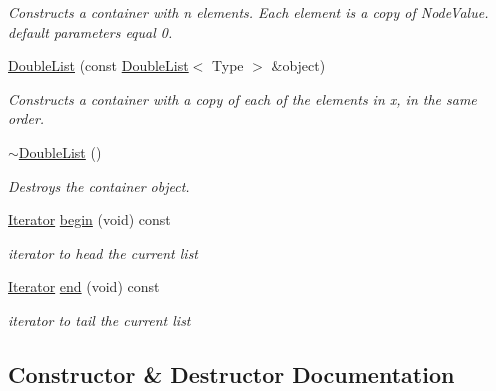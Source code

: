 \begin{DoxyCompactItemize}
\begin{DoxyCompactList}\small\item\em Constructs a container with n elements. Each element is a copy of Node\+Value. default parameters equal 0. \end{DoxyCompactList}\item 
\hyperlink{classDoubleList_aba69ed048141748e3269969748b12c0a}{Double\+List} (const \hyperlink{classDoubleList}{Double\+List}$<$ Type $>$ \&object)
\begin{DoxyCompactList}\small\item\em Constructs a container with a copy of each of the elements in x, in the same order. \end{DoxyCompactList}\item 
\mbox{\label{classDoubleList_a22b87f4d294b23987e1f19cce85f276e}} 
\hyperlink{classDoubleList_a22b87f4d294b23987e1f19cce85f276e}{$\sim$\+Double\+List} ()
\begin{DoxyCompactList}\small\item\em Destroys the container object. \end{DoxyCompactList}\item 
\hyperlink{classDoubleList_1_1Iterator}{Iterator} \hyperlink{classDoubleList_a63f8896f6da1cd0af88e837260d5bbf0}{begin} (void) const
\begin{DoxyCompactList}\small\item\em iterator to head the current list \end{DoxyCompactList}\item 
\hyperlink{classDoubleList_1_1Iterator}{Iterator} \hyperlink{classDoubleList_a701f4210e8adb12facfc29308971c9f6}{end} (void) const
\begin{DoxyCompactList}\small\item\em iterator to tail the current list \end{DoxyCompactList}\end{DoxyCompactItemize}


\subsection{Constructor \& Destructor Documentation}
\mbox{\label{classDoubleList_a0a5f827968e87609730b0a97dcd08105}} 
